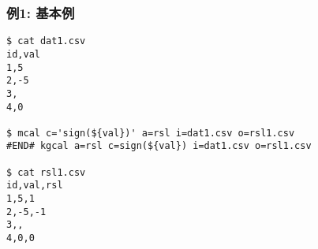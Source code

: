 
\subsubsection*{例1: 基本例}


\begin{Verbatim}[baselinestretch=0.7,frame=single]
$ cat dat1.csv
id,val
1,5
2,-5
3,
4,0

$ mcal c='sign(${val})' a=rsl i=dat1.csv o=rsl1.csv
#END# kgcal a=rsl c=sign(${val}) i=dat1.csv o=rsl1.csv

$ cat rsl1.csv
id,val,rsl
1,5,1
2,-5,-1
3,,
4,0,0
\end{Verbatim}
